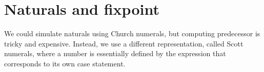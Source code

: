\begin{fence}
\begin{code}
\\
\>[4][@{}l@{\AgdaIndent{0}}]%
\>[5]\AgdaSymbol{(}\<%
\\
\>[5][@{}l@{\AgdaIndent{0}}]%
\>[6]\AgdaSymbol{(}\<%
\\
\>[6][@{}l@{\AgdaIndent{0}}]%
\>[7]\AgdaSymbol{(}\AgdaSpace{}%
\AgdaSymbol{(}\AgdaSpace{}%
\AgdaSymbol{))}\AgdaSpace{}%
\<%
\\
%
\>[7]\AgdaSymbol{(}\AgdaSpace{}%
\AgdaSymbol{(}\AgdaSpace{}%
\AgdaSymbol{(}\AgdaSpace{}%
\AgdaSymbol{))}\AgdaSpace{}%
\AgdaSpace{}%
\AgdaSymbol{(}\AgdaSpace{}%
\AgdaSymbol{(}\AgdaSpace{}%
\AgdaSymbol{(}\AgdaSpace{}%
\AgdaSymbol{))}\AgdaSpace{}%
\AgdaSpace{}%
\AgdaSymbol{(}\AgdaSpace{}%
\AgdaSymbol{(}\AgdaSpace{}%
\AgdaSymbol{(}\AgdaSpace{}%
\AgdaSymbol{))}\AgdaSpace{}%
\AgdaSpace{}%
\AgdaSymbol{(}\AgdaSpace{}%
\AgdaSymbol{(}\AgdaSpace{}%
\AgdaSymbol{)))))))))}\<%
\\
\>[0]\AgdaSymbol{\AgdaUnderscore{}}\AgdaSpace{}%
\AgdaSymbol{=}\AgdaSpace{}%
\<%
\end{code}
\end{fence}

\hypertarget{naturals-and-fixpoint}{%
\section{Naturals and fixpoint}\label{naturals-and-fixpoint}}

We could simulate naturals using Church numerals, but computing
predecessor is tricky and expensive. Instead, we use a different
representation, called Scott numerals, where a number is essentially
defined by the expression that corresponds to its own case statement.

